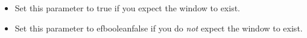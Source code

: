 \begin{itemize}
\item Set this parameter to true if you expect the window to exist.
\item Set this parameter to \app{}efbooleanfalse if you do \emph{not} expect the window to exist.
\end{itemize}
